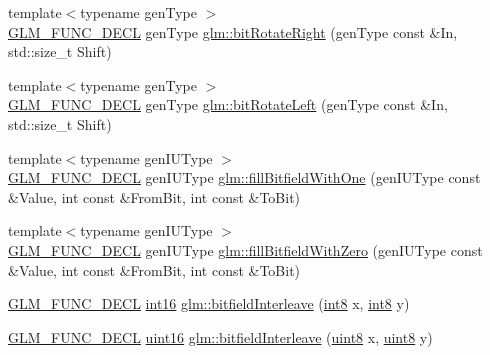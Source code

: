 \begin{DoxyCompactItemize}
\item 
{\footnotesize template$<$typename gen\+Type $>$ }\\\hyperlink{setup_8hpp_ab2d052de21a70539923e9bcbf6e83a51}{G\+L\+M\+\_\+\+F\+U\+N\+C\+\_\+\+D\+E\+CL} gen\+Type \hyperlink{group__gtx__bit_gaf999dbfe97a5be5ea68841a58cf89a4a}{glm\+::bit\+Rotate\+Right} (gen\+Type const \&In, std\+::size\+\_\+t Shift)
\item 
{\footnotesize template$<$typename gen\+Type $>$ }\\\hyperlink{setup_8hpp_ab2d052de21a70539923e9bcbf6e83a51}{G\+L\+M\+\_\+\+F\+U\+N\+C\+\_\+\+D\+E\+CL} gen\+Type \hyperlink{group__gtx__bit_ga32c0a5149152a9aa75afafe81b19be53}{glm\+::bit\+Rotate\+Left} (gen\+Type const \&In, std\+::size\+\_\+t Shift)
\item 
{\footnotesize template$<$typename gen\+I\+U\+Type $>$ }\\\hyperlink{setup_8hpp_ab2d052de21a70539923e9bcbf6e83a51}{G\+L\+M\+\_\+\+F\+U\+N\+C\+\_\+\+D\+E\+CL} gen\+I\+U\+Type \hyperlink{group__gtx__bit_gafac2a9e0ef0d5d2fc4e569bff2b2f452}{glm\+::fill\+Bitfield\+With\+One} (gen\+I\+U\+Type const \&Value, int const \&From\+Bit, int const \&To\+Bit)
\item 
{\footnotesize template$<$typename gen\+I\+U\+Type $>$ }\\\hyperlink{setup_8hpp_ab2d052de21a70539923e9bcbf6e83a51}{G\+L\+M\+\_\+\+F\+U\+N\+C\+\_\+\+D\+E\+CL} gen\+I\+U\+Type \hyperlink{group__gtx__bit_ga0c514d45387003260783ba6a8a4f3285}{glm\+::fill\+Bitfield\+With\+Zero} (gen\+I\+U\+Type const \&Value, int const \&From\+Bit, int const \&To\+Bit)
\item 
\hyperlink{setup_8hpp_ab2d052de21a70539923e9bcbf6e83a51}{G\+L\+M\+\_\+\+F\+U\+N\+C\+\_\+\+D\+E\+CL} \hyperlink{group__gtc__type__precision_ga2945a61d12771f8954994fcddf02b021}{int16} \hyperlink{group__gtx__bit_ga479134317bc95d99f2b2e235d3db287b}{glm\+::bitfield\+Interleave} (\hyperlink{group__gtc__type__precision_ga96254f9c1c4506fc8eb5cf3301ce8565}{int8} x, \hyperlink{group__gtc__type__precision_ga96254f9c1c4506fc8eb5cf3301ce8565}{int8} y)
\item 
\hyperlink{setup_8hpp_ab2d052de21a70539923e9bcbf6e83a51}{G\+L\+M\+\_\+\+F\+U\+N\+C\+\_\+\+D\+E\+CL} \hyperlink{group__gtc__type__precision_gad8c2939e1fdd8e5828b31d95c52255d5}{uint16} \hyperlink{group__gtx__bit_ga0700a3ceb088a0ecc23d76c154096061}{glm\+::bitfield\+Interleave} (\hyperlink{group__gtc__type__precision_ga1a7dcd8aac97cc8020817c94049deff2}{uint8} x, \hyperlink{group__gtc__type__precision_ga1a7dcd8aac97cc8020817c94049deff2}{uint8} y)

\end{DoxyCompactItemize}
